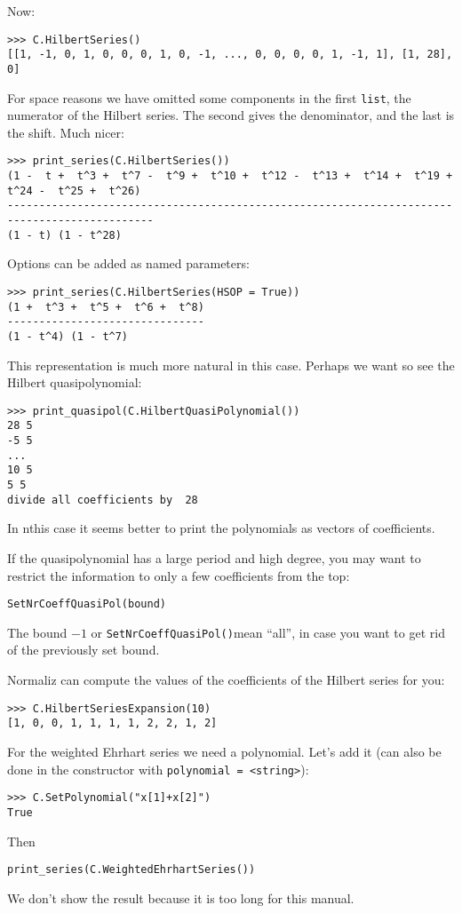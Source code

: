 \documentclass[12pt,a4paper]{scrartcl}
\theoremstyle{definition}
\begin{document}
\begin{small}
Now:
\begin{Verbatim}
>>> C.HilbertSeries()
[[1, -1, 0, 1, 0, 0, 0, 1, 0, -1, ..., 0, 0, 0, 0, 1, -1, 1], [1, 28], 0]
\end{Verbatim}
For space reasons we have omitted some components in the first \verb|list|, the numerator of the Hilbert series. The second gives the denominator, and the last is the shift. Much nicer:
\begin{Verbatim}
>>> print_series(C.HilbertSeries())
(1 -  t +  t^3 +  t^7 -  t^9 +  t^10 +  t^12 -  t^13 +  t^14 +  t^19 +  t^24 -  t^25 +  t^26)
---------------------------------------------------------------------------------------------
(1 - t) (1 - t^28) 
\end{Verbatim}

Options can be added as named parameters:
\begin{Verbatim}
>>> print_series(C.HilbertSeries(HSOP = True))
(1 +  t^3 +  t^5 +  t^6 +  t^8)
-------------------------------
(1 - t^4) (1 - t^7)   
\end{Verbatim}
This representation is much more natural in this case. Perhaps we want so see the Hilbert quasipolynomial:
\begin{Verbatim}
>>> print_quasipol(C.HilbertQuasiPolynomial())
28 5
-5 5
...
10 5
5 5
divide all coefficients by  28
\end{Verbatim}
In nthis case it seems better to print the polynomials as vectors of coefficients.

If the quasipolynomial has a large period and high degree, you may want to restrict the information to only a few coefficients from the top:
\begin{Verbatim}
SetNrCoeffQuasiPol(bound)
\end{Verbatim}
The bound $-1$ or \verb|SetNrCoeffQuasiPol()|mean ``all'', in case you want to get rid of the previously set bound.

Normaliz can compute the values of the coefficients of the Hilbert series for you:
\begin{Verbatim}
>>> C.HilbertSeriesExpansion(10)
[1, 0, 0, 1, 1, 1, 1, 2, 2, 1, 2]
\end{Verbatim}

For the weighted Ehrhart series we need a polynomial. Let's add it (can also be done in the constructor with \verb|polynomial = <string>|):
\begin{Verbatim}
>>> C.SetPolynomial("x[1]+x[2]")
True
\end{Verbatim}
Then
\begin{Verbatim}
print_series(C.WeightedEhrhartSeries())
\end{Verbatim}
We don't show the result because it is too long for this manual.


\end{small}
\end{document}
